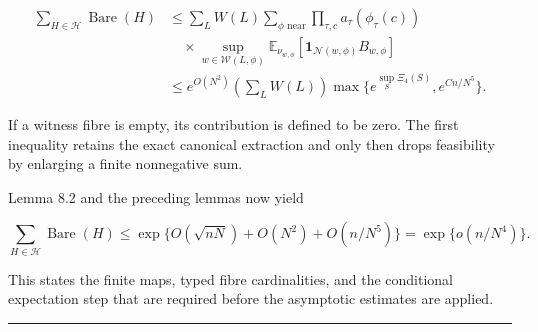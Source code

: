 \documentclass[11pt]{article}
\begin{document}
\[
 \begin{split}
 \sum_{H\in\mathcal H}\operatorname{Bare}(H)
 &\le\sum_L W(L)
   \sum_{\phi\text{ near}}
      \prod_{\tau,c}a_\tau(\phi_\tau(c))\\
 &\quad\times
   \sup_{w\in\mathcal W(L,\phi)}
   \mathbb E_{\nu_{w,\phi}}[
      \mathbf1_{\mathcal N(w,\phi)}B_{w,\phi}]\\
 &\le e^{O(N^2)}\left(\sum_LW(L)\right)
       \max\{e^{\sup_S\Xi_4(S)},e^{Cn/N^5}\}.
 \end{split}
 \tag{8.29d}
\]

If a witness fibre is empty, its contribution is defined to be zero. The first inequality retains the exact canonical extraction and only then drops feasibility by enlarging a finite nonnegative sum.

Lemma 8.2 and the preceding lemmas now yield

\[
 \sum_{H\in\mathcal H}\operatorname{Bare}(H)
 \le\exp\{O(\sqrt{nN})+O(N^2)+O(n/N^5)\}
 =\exp\{o(n/N^4)\}.
 \tag{8.30}
\]

This states the finite maps, typed fibre cardinalities, and the conditional expectation step that are required before the asymptotic estimates are applied.

\begin{center}\rule{0.5\linewidth}{0.5pt}\end{center}
\end{document}
